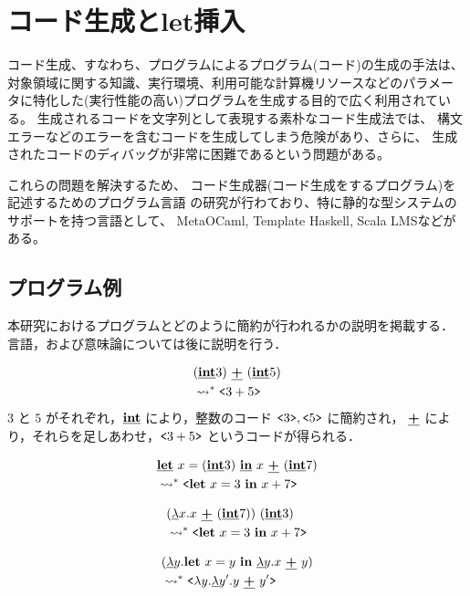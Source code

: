 
\section{コード生成とlet挿入}

コード生成、すなわち、プログラムによるプログラム(コード)の生成の手法は、
対象領域に関する知識、実行環境、利用可能な計算機リソースなどのパラメー
タに特化した(実行性能の高い)プログラムを生成する目的で広く利用されている。
生成されるコードを文字列として表現する素朴なコード生成法では、
構文エラーなどのエラーを含むコードを生成してしまう危険があり、さらに、
生成されたコードのディバッグが非常に困難であるという問題がある。

これらの問題を解決するため、
コード生成器(コード生成をするプログラム)を記述するためのプログラム言語
の研究が行わており、特に静的な型システムのサポートを持つ言語として、
MetaOCaml, Template Haskell, Scala LMSなどがある。



\subsection{プログラム例}
本研究におけるプログラムとどのように簡約が行われるかの説明を掲載する．
言語，および意味論については後に説明を行う．

\begin{align}
  & (\underline{\textbf{int}} 3)~ \underline{\textbf{+}}~ (\underline{\textbf{int}} 5) \\
  & \leadsto^* \texttt{<}{3 + 5}\texttt{>} \nonumber
\end{align}
$3$ と $5$ がそれぞれ，$\underline{\textbf{int}}$ により，整数のコード $\texttt{<}{3}\texttt{>},\texttt{<}{5}\texttt{>}$ に簡約され，
$\underline{\textbf{+}}$ により，それらを足しあわせ，$\texttt{<}{3 + 5}\texttt{>}$ というコードが得られる．

\begin{align}
  & \underline{\textbf{let}}~ x = (\underline{\textbf{int}}{3})~ \underline{\textbf{in}}~ x~ \underline{\textbf{+}}~ (\underline{\textbf{int}} 7)  \\
  & \leadsto^* \texttt{<}{\textbf{let}~ x = 3~ \textbf{in}~ x + 7}\texttt{>} \nonumber
\end{align}


\begin{align}
  & (\underline{\lambda}{x}.{x~ \underline{\textbf{+}}~ (\underline{\textbf{int}} 7))~}{(\underline{\textbf{int}} 3)} \\
  & \leadsto^* \texttt{<}{\textbf{let}~ x = 3~ \textbf{in}~ x + 7}\texttt{>} \nonumber
\end{align}

\begin{align}
  & (\underline{\lambda}{y}.{\textbf{let}~ x = y~ \textbf{in}~ \underline{\lambda}{y}.{x~ \underline{\textbf{+}}~ y}{}}{}) \\
  & \leadsto^* \texttt{<}{\lambda{y}.{\underline{\lambda}{y'}.{}{}}{y~ \underline{\textbf{+}}~ y'}}\texttt{>} \nonumber
\end{align}


